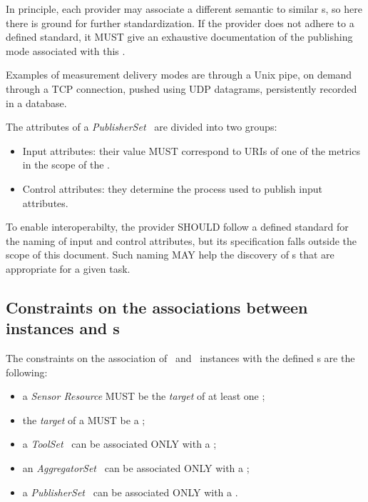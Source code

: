 \documentclass[12pt]{article}  %
\begin{document}
In principle, each provider may associate a different semantic to similar \mi s, so here there is ground for further standardization. If the provider does not adhere to a defined standard, it MUST give an exhaustive documentation of the publishing mode associated with this \mi.

Examples of measurement delivery modes are through a Unix pipe, on demand through a TCP connection, pushed using UDP datagrams, persistently recorded in a database.

The attributes of a {\em PublisherSet} \mi\ are divided into two groups:

\begin{itemize}
\item Input attributes: their value MUST correspond to URIs of one of the metrics in the scope of the \sens.
\item Control attributes: they determine the process used to publish input attributes.
\end{itemize}

To enable interoperabilty, the provider SHOULD follow a defined standard for the naming of input and control attributes, but its specification falls outside the scope of this document. Such naming MAY help the discovery of \mi s that are appropriate for a given task.

\subsection{Constraints on the associations between instances and \mi s}

The constraints on the association of \sens\ and \coll\ instances with the defined \mi s are the following:

\begin{itemize}

\item a {\em Sensor Resource} MUST be the {\em target} of at least one \coll ;

\item the {\em target} of a {\em \coll} MUST be a \sens ;

\item a {\em ToolSet} \mi\ can be associated ONLY with a \coll;

\item an {\em AggregatorSet} \mi\ can be associated ONLY with a \sens;

\item a {\em PublisherSet} \mi\ can be associated ONLY with a \sens.

\end{itemize}
\end{document}
